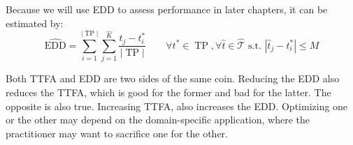 Because we will use EDD to assess performance in later chapters, it can be estimated by:
\begin{equation}
\label{est_edd}
\widehat{\text{EDD}} = \sum_{i=1}^{|\operatorname{TP}|} \sum_{j=1}^{\hat{K}} \frac{\hat{t}_j - t_i^*}{|\operatorname{TP}|} \quad \quad \forall t^* \in \operatorname{TP}, \forall \hat{t} \in \hat{\mathcal{T}} \text{ s.t. } |\hat{t}_j - t_i^*| \leq M
\end{equation} 

Both TTFA and EDD are two sides of the same coin. Reducing the EDD also reduces the TTFA, which is good for the former and bad for the latter. The opposite is also true. Increasing TTFA, also increases the EDD. Optimizing one or the other may depend on the domain-specific application, where the practitioner may want to sacrifice one for the other. 






